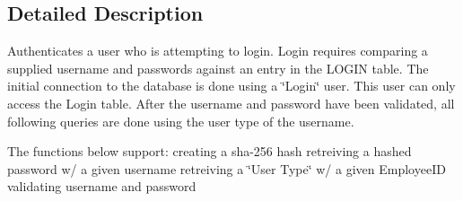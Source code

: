 \subsection{Detailed Description}
Authenticates a user who is attempting to login. Login requires comparing a supplied username and passwords against an entry in the L\-O\-G\-I\-N table. The initial connection to the database is done using a \char`\"{}\-Login\char`\"{} user. This user can only access the Login table. After the username and password have been validated, all following queries are done using the user type of the username.

The functions below support\-: creating a sha-\/256 hash retreiving a hashed password w/ a given username retreiving a \char`\"{}\-User Type\char`\"{} w/ a given Employee\-I\-D validating username and password 

